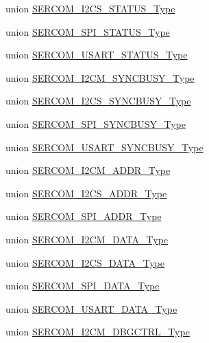 \begin{DoxyCompactItemize}
\item 
union \hyperlink{union_s_e_r_c_o_m___i2_c_s___s_t_a_t_u_s___type}{S\+E\+R\+C\+O\+M\+\_\+\+I2\+C\+S\+\_\+\+S\+T\+A\+T\+U\+S\+\_\+\+Type}
\item 
union \hyperlink{union_s_e_r_c_o_m___s_p_i___s_t_a_t_u_s___type}{S\+E\+R\+C\+O\+M\+\_\+\+S\+P\+I\+\_\+\+S\+T\+A\+T\+U\+S\+\_\+\+Type}
\item 
union \hyperlink{union_s_e_r_c_o_m___u_s_a_r_t___s_t_a_t_u_s___type}{S\+E\+R\+C\+O\+M\+\_\+\+U\+S\+A\+R\+T\+\_\+\+S\+T\+A\+T\+U\+S\+\_\+\+Type}
\item 
union \hyperlink{union_s_e_r_c_o_m___i2_c_m___s_y_n_c_b_u_s_y___type}{S\+E\+R\+C\+O\+M\+\_\+\+I2\+C\+M\+\_\+\+S\+Y\+N\+C\+B\+U\+S\+Y\+\_\+\+Type}
\item 
union \hyperlink{union_s_e_r_c_o_m___i2_c_s___s_y_n_c_b_u_s_y___type}{S\+E\+R\+C\+O\+M\+\_\+\+I2\+C\+S\+\_\+\+S\+Y\+N\+C\+B\+U\+S\+Y\+\_\+\+Type}
\item 
union \hyperlink{union_s_e_r_c_o_m___s_p_i___s_y_n_c_b_u_s_y___type}{S\+E\+R\+C\+O\+M\+\_\+\+S\+P\+I\+\_\+\+S\+Y\+N\+C\+B\+U\+S\+Y\+\_\+\+Type}
\item 
union \hyperlink{union_s_e_r_c_o_m___u_s_a_r_t___s_y_n_c_b_u_s_y___type}{S\+E\+R\+C\+O\+M\+\_\+\+U\+S\+A\+R\+T\+\_\+\+S\+Y\+N\+C\+B\+U\+S\+Y\+\_\+\+Type}
\item 
union \hyperlink{union_s_e_r_c_o_m___i2_c_m___a_d_d_r___type}{S\+E\+R\+C\+O\+M\+\_\+\+I2\+C\+M\+\_\+\+A\+D\+D\+R\+\_\+\+Type}
\item 
union \hyperlink{union_s_e_r_c_o_m___i2_c_s___a_d_d_r___type}{S\+E\+R\+C\+O\+M\+\_\+\+I2\+C\+S\+\_\+\+A\+D\+D\+R\+\_\+\+Type}
\item 
union \hyperlink{union_s_e_r_c_o_m___s_p_i___a_d_d_r___type}{S\+E\+R\+C\+O\+M\+\_\+\+S\+P\+I\+\_\+\+A\+D\+D\+R\+\_\+\+Type}
\item 
union \hyperlink{union_s_e_r_c_o_m___i2_c_m___d_a_t_a___type}{S\+E\+R\+C\+O\+M\+\_\+\+I2\+C\+M\+\_\+\+D\+A\+T\+A\+\_\+\+Type}
\item 
union \hyperlink{union_s_e_r_c_o_m___i2_c_s___d_a_t_a___type}{S\+E\+R\+C\+O\+M\+\_\+\+I2\+C\+S\+\_\+\+D\+A\+T\+A\+\_\+\+Type}
\item 
union \hyperlink{union_s_e_r_c_o_m___s_p_i___d_a_t_a___type}{S\+E\+R\+C\+O\+M\+\_\+\+S\+P\+I\+\_\+\+D\+A\+T\+A\+\_\+\+Type}
\item 
union \hyperlink{union_s_e_r_c_o_m___u_s_a_r_t___d_a_t_a___type}{S\+E\+R\+C\+O\+M\+\_\+\+U\+S\+A\+R\+T\+\_\+\+D\+A\+T\+A\+\_\+\+Type}
\item 
union \hyperlink{union_s_e_r_c_o_m___i2_c_m___d_b_g_c_t_r_l___type}{S\+E\+R\+C\+O\+M\+\_\+\+I2\+C\+M\+\_\+\+D\+B\+G\+C\+T\+R\+L\+\_\+\+Type}

\end{DoxyCompactItemize}

